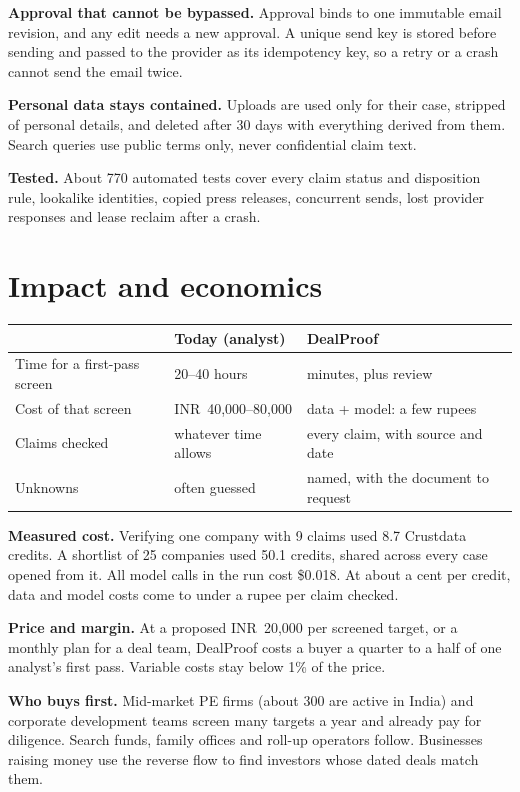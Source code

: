 \documentclass[11pt,a4paper]{article}
\begin{document}
\textbf{Approval that cannot be bypassed.} Approval binds to one immutable email revision, and any edit needs a new approval. A unique send key is stored before sending and passed to the provider as its idempotency key, so a retry or a crash cannot send the email twice.

\textbf{Personal data stays contained.} Uploads are used only for their case, stripped of personal details, and deleted after 30 days with everything derived from them. Search queries use public terms only, never confidential claim text.

\textbf{Tested.} About 770 automated tests cover every claim status and disposition rule, lookalike identities, copied press releases, concurrent sends, lost provider responses and lease reclaim after a crash.

\section{Impact and economics}
\begin{table}[h]
\centering\small
\begin{tabularx}{\linewidth}{@{}Xll@{}}
\toprule
 & \textbf{Today (analyst)} & \textbf{DealProof} \\
\midrule
Time for a first-pass screen & 20--40 hours & minutes, plus review \\
Cost of that screen & INR~40,000--80,000 & data + model: a few rupees \\
Claims checked & whatever time allows & every claim, with source and date \\
Unknowns & often guessed & named, with the document to request \\
\bottomrule
\end{tabularx}
\end{table}

\textbf{Measured cost.} Verifying one company with 9 claims used 8.7 Crustdata credits. A shortlist of 25 companies used 50.1 credits, shared across every case opened from it. All model calls in the run cost \$0.018. At about a cent per credit, data and model costs come to under a rupee per claim checked.

\textbf{Price and margin.} At a proposed INR~20,000 per screened target, or a monthly plan for a deal team, DealProof costs a buyer a quarter to a half of one analyst's first pass. Variable costs stay below 1\% of the price.

\textbf{Who buys first.} Mid-market PE firms (about 300 are active in India) and corporate development teams screen many targets a year and already pay for diligence. Search funds, family offices and roll-up operators follow. Businesses raising money use the reverse flow to find investors whose dated deals match them.
\end{document}
